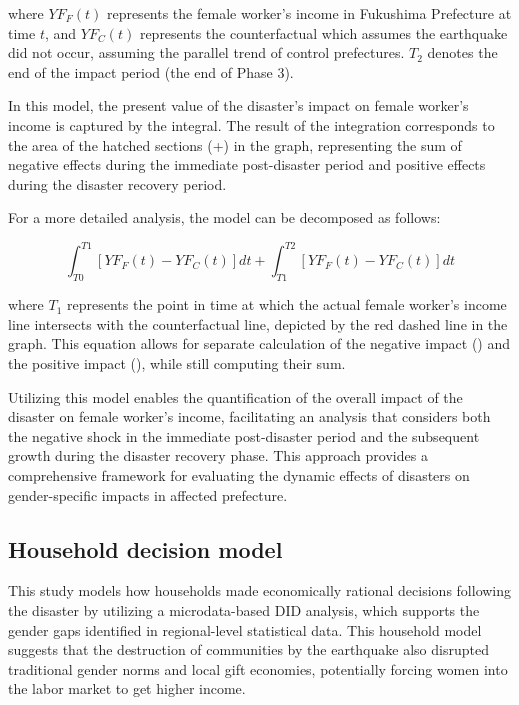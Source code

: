 \documentclass[a4paper,12pt]{article}
\begin{document}
where $YF_F(t)$ represents the female worker's income in Fukushima Prefecture at time $t$, and $YF_C(t)$ represents the counterfactual which assumes the earthquake did not occur, assuming the parallel trend of control prefectures. $T_{2}$ denotes the end of the impact period (the end of Phase 3).

In this model, the present value of the disaster's impact on female worker's income is captured by the integral. The result of the integration corresponds to the area of the hatched sections (+) in the graph, representing the sum of negative effects during the immediate post-disaster period and positive effects during the disaster recovery period.

For a more detailed analysis, the model can be decomposed as follows:

\begin{equation}
\int_{T0}^{T1} [YF_F(t) - YF_C(t)] dt + \int_{T1}^{T2} [YF_F(t) - YF_C(t)] dt
\end{equation}

where $T_{1}$ represents the point in time at which the actual female worker's income line intersects with the counterfactual line, depicted by the red dashed line in the graph. This equation allows for separate calculation of the negative impact () and the positive impact (), while still computing their sum.

Utilizing this model enables the quantification of the overall impact of the disaster on female worker's income, facilitating an analysis that considers both the negative shock in the immediate post-disaster period and the subsequent growth during the disaster recovery phase. This approach provides a comprehensive framework for evaluating the dynamic effects of disasters on gender-specific impacts in affected prefecture.


\subsection{Household decision model}
\label{sec5.1}

This study models how households made economically rational decisions following the disaster by utilizing a microdata-based DID analysis, which supports the gender gaps identified in regional-level statistical data. This household model suggests that the destruction of communities by the earthquake also disrupted traditional gender norms and local gift economies, potentially forcing women into the labor market to get higher income.
\end{document}
